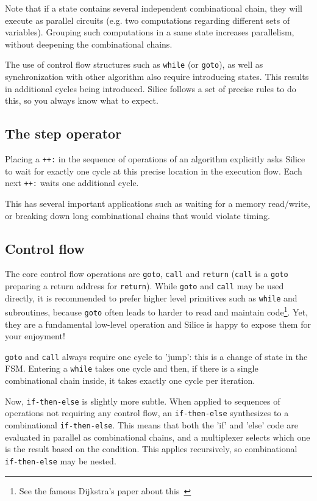 \documentclass[a4]{article}
\newcommand\silice{Silice}
\begin{document}
Note that if a state contains several independent combinational chain, they will execute as parallel circuits (e.g. two computations regarding different sets of variables). Grouping such computations in a same state increases parallelism, without deepening the combinational chains.

The use of control flow structures such as \texttt{while} (or \texttt{goto}), as well as synchronization with other algorithm also require introducing states. This results in additional cycles being introduced. \silice{} follows a set of precise rules to do this, so you always know what to expect.

\subsection{The {step} operator}
\label{sec:step}

Placing a \texttt{++:} in the sequence of operations of an algorithm explicitly asks \silice{} to wait for exactly one cycle at this precise location in the execution flow. Each next \texttt{++:} waits one additional cycle.

This has several important applications such as waiting for a memory read/write, or breaking down long combinational chains that would violate timing.


\subsection{Control flow}

The core control flow operations are \texttt{goto}, \texttt{call} and \texttt{return} (\texttt{call} is a \texttt{goto} preparing a return address for \texttt{return}). 
%
While \texttt{goto} and \texttt{call} may be used directly, it is recommended to prefer higher level primitives such as \texttt{while} and subroutines, because \texttt{goto} often leads to harder to read and maintain code\footnote{See the famous Dijkstra's paper about this~\cite{dijkstra}}. 
Yet, they are a fundamental low-level operation and \silice{} is happy to expose them for your enjoyment!

\texttt{goto} and \texttt{call} always require one cycle to 'jump': this is a change of state in the FSM. Entering a \texttt{while} takes one cycle and then, if there is a single combinational chain inside, it takes exactly one cycle per iteration. 

Now, \texttt{if-then-else} is slightly more subtle. When applied to sequences of operations not requiring any control flow, an \texttt{if-then-else} synthesizes to a combinational \texttt{if-then-else}. This means that both the 'if' and 'else' code are evaluated in parallel as combinational chains, and a multiplexer selects which one is the result based on the condition. This applies recursively, so combinational \texttt{if-then-else} may be nested.
\end{document}
